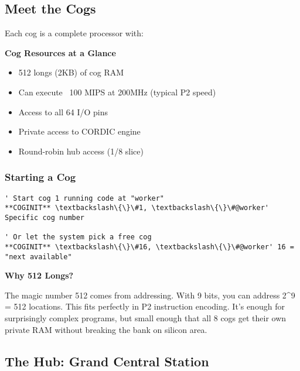 \documentclass[11pt]{book}
\begin{document}
\hypertarget{meet-the-cogs}{%
\subsection{Meet the Cogs}\label{meet-the-cogs}}

Each cog is a complete processor with:

\begin{sidetrack}
\textbf{Cog Resources at a Glance}
\begin{itemize}
\item 512 longs (2KB) of cog RAM
\item Can execute ~100 MIPS at 200MHz (typical P2 speed)
\item Access to all 64 I/O pins
\item Private access to CORDIC engine
\item Round-robin hub access (1/8 slice)
\end{itemize}
\end{sidetrack}

\hypertarget{starting-a-cog}{%
\subsubsection{Starting a Cog}\label{starting-a-cog}}

\begin{lstlisting}
' Start cog 1 running code at "worker"
**COGINIT** \textbackslash\{\}\#1, \textbackslash\{\}\#@worker' Specific cog number
        
' Or let the system pick a free cog
**COGINIT** \textbackslash\{\}\#16, \textbackslash\{\}\#@worker' 16 = "next available"
\end{lstlisting}

\begin{sidetrack}
\textbf{Why 512 Longs?}

The magic number 512 comes from addressing. With 9 bits, you can address 2\^{}9 = 512 locations. This fits perfectly in P2 instruction encoding. It's enough for surprisingly complex programs, but small enough that all 8 cogs get their own private RAM without breaking the bank on silicon area.
\end{sidetrack}

\hypertarget{the-hub-grand-central-station}{%
\subsection{The Hub: Grand Central
Station}\label{the-hub-grand-central-station}}
\end{document}
